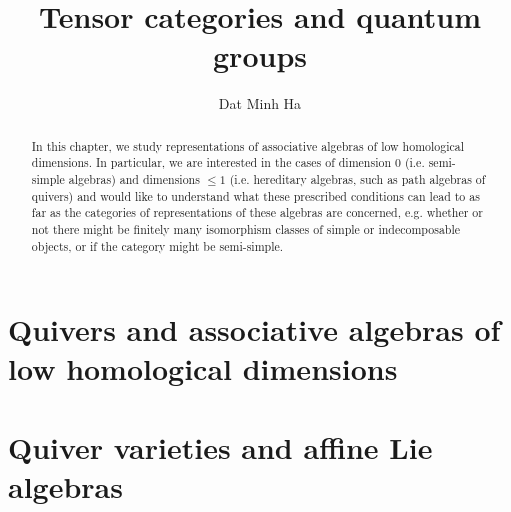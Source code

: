 

\setcounter{chapter}{-1}
\setcounter{section}{-1}





	\title{Tensor categories and quantum groups}
	
	\author{Dat Minh Ha}
	\maketitle
	
	\begin{abstract}
	    
	\end{abstract}
	
	{
      \hypersetup{} 
      \dominitoc
      \tableofcontents %
    }
    
    
    
    \chapter{Quivers and associative algebras of low homological dimensions}
        \begin{abstract}
            In this chapter, we study representations of associative algebras of low homological dimensions. In particular, we are interested in the cases of dimension $0$ (i.e. semi-simple algebras) and dimensions $\leq 1$ (i.e. hereditary algebras, such as path algebras of quivers) and would like to understand what these prescribed conditions can lead to as far as the categories of representations of these algebras are concerned, e.g. whether or not there might be finitely many isomorphism classes of simple or indecomposable objects, or if the category might be semi-simple. 
        \end{abstract}
        
        \minitoc
        
        
        
        
        
        
        
    \chapter{Quiver varieties and affine Lie algebras}
        \begin{abstract}
            
        \end{abstract}
        
